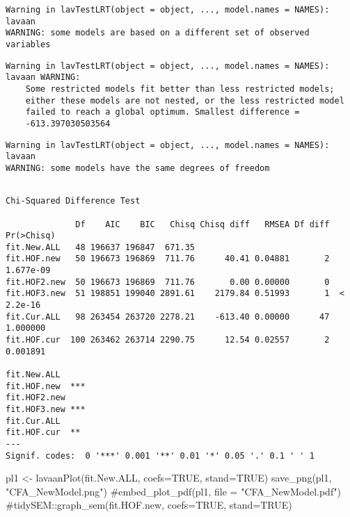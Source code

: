 \documentclass[
  letterpaper,
  DIV=11,
  numbers=noendperiod]{scrartcl}
\newenvironment{Shaded}{\begin{snugshade}}{\end{snugshade}}
\newcommand{\AttributeTok}[1]{\textcolor[rgb]{0.40,0.45,0.13}{#1}}
\newcommand{\CommentTok}[1]{\textcolor[rgb]{0.37,0.37,0.37}{#1}}
\newcommand{\ConstantTok}[1]{\textcolor[rgb]{0.56,0.35,0.01}{#1}}
\newcommand{\FunctionTok}[1]{\textcolor[rgb]{0.28,0.35,0.67}{#1}}
\newcommand{\NormalTok}[1]{\textcolor[rgb]{0.00,0.23,0.31}{#1}}
\newcommand{\OtherTok}[1]{\textcolor[rgb]{0.00,0.23,0.31}{#1}}
\newcommand{\StringTok}[1]{\textcolor[rgb]{0.13,0.47,0.30}{#1}}
\begin{document}
\begin{verbatim}
Warning in lavTestLRT(object = object, ..., model.names = NAMES): lavaan
WARNING: some models are based on a different set of observed variables
\end{verbatim}

\begin{verbatim}
Warning in lavTestLRT(object = object, ..., model.names = NAMES): lavaan WARNING:
    Some restricted models fit better than less restricted models;
    either these models are not nested, or the less restricted model
    failed to reach a global optimum. Smallest difference =
    -613.397030503564
\end{verbatim}

\begin{verbatim}
Warning in lavTestLRT(object = object, ..., model.names = NAMES): lavaan
WARNING: some models have the same degrees of freedom
\end{verbatim}

\begin{verbatim}

Chi-Squared Difference Test

              Df    AIC    BIC   Chisq Chisq diff   RMSEA Df diff Pr(>Chisq)
fit.New.ALL   48 196637 196847  671.35                                      
fit.HOF.new   50 196673 196869  711.76      40.41 0.04881       2  1.677e-09
fit.HOF2.new  50 196673 196869  711.76       0.00 0.00000       0           
fit.HOF3.new  51 198851 199040 2891.61    2179.84 0.51993       1  < 2.2e-16
fit.Cur.ALL   98 263454 263720 2278.21    -613.40 0.00000      47   1.000000
fit.HOF.cur  100 263462 263714 2290.75      12.54 0.02557       2   0.001891
                
fit.New.ALL     
fit.HOF.new  ***
fit.HOF2.new    
fit.HOF3.new ***
fit.Cur.ALL     
fit.HOF.cur  ** 
---
Signif. codes:  0 '***' 0.001 '**' 0.01 '*' 0.05 '.' 0.1 ' ' 1
\end{verbatim}

\begin{Shaded}
\begin{Highlighting}[]
\NormalTok{pl1 }\OtherTok{\textless{}{-}} \FunctionTok{lavaanPlot}\NormalTok{(fit.New.ALL, }\AttributeTok{coefs=}\ConstantTok{TRUE}\NormalTok{, }\AttributeTok{stand=}\ConstantTok{TRUE}\NormalTok{)}
\FunctionTok{save\_png}\NormalTok{(pl1, }\StringTok{"CFA\_NewModel.png"}\NormalTok{)}
\CommentTok{\#embed\_plot\_pdf(pl1, file = "CFA\_NewModel.pdf")}
\CommentTok{\#tidySEM::graph\_sem(fit.HOF.new, coefs=TRUE, stand=TRUE)}
\end{Highlighting}
\end{Shaded}
\end{document}
